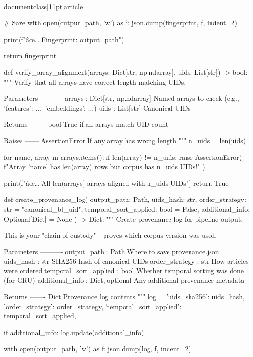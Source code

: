 \\documentclass[11pt]{article}
\begin{document}
\begin{CodeBlock}
    # Save
    with open(output_path, 'w') as f:
        json.dump(fingerprint, f, indent=2)
    
    print(f"âœ… Fingerprint: {output_path}")
    
    return fingerprint


def verify_array_alignment(arrays: Dict[str, np.ndarray], uids: List[str]) -> bool:
    """
    Verify that all arrays have correct length matching UIDs.
    
    Parameters
    ----------
    arrays : Dict[str, np.ndarray]
        Named arrays to check (e.g., {'features': ..., 'embeddings': ...})
    uids : List[str]
        Canonical UIDs
    
    Returns
    -------
    bool
        True if all arrays match UID count
    
    Raises
    ------
    AssertionError
        If any array has wrong length
    """
    n_uids = len(uids)
    
    for name, array in arrays.items():
        if len(array) != n_uids:
            raise AssertionError(
                f"Array '{name}' has {len(array)} rows but corpus has {n_uids} UIDs!"
            )
    
    print(f"âœ… All {len(arrays)} arrays aligned with {n_uids} UIDs")
    return True


def create_provenance_log(
    output_path: Path,
    uids_hash: str,
    order_strategy: str = "canonical_bt_uid",
    temporal_sort_applied: bool = False,
    additional_info: Optional[Dict] = None
) -> Dict:
    """
    Create provenance log for pipeline output.
    
    This is your "chain of custody" - proves which corpus version was used.
    
    Parameters
    ----------
    output_path : Path
        Where to save provenance.json
    uids_hash : str
        SHA256 hash of canonical UIDs
    order_strategy : str
        How articles were ordered
    temporal_sort_applied : bool
        Whether temporal sorting was done (for GRU)
    additional_info : Dict, optional
        Any additional provenance metadata
    
    Returns
    -------
    Dict
        Provenance log contents
    """
    log = {
        'uids_sha256': uids_hash,
        'order_strategy': order_strategy,
        'temporal_sort_applied': temporal_sort_applied,
    }
    
    if additional_info:
        log.update(additional_info)
    
    with open(output_path, 'w') as f:
        json.dump(log, f, indent=2)
    

\end{CodeBlock}
\end{document}
